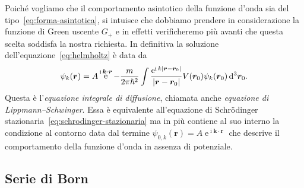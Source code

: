 \documentclass[a4paper,fleqn,twoside,12pt]{article}
\newcommand*{\dd}{\mathop{}\!\mathrm{d}} %
\DeclareMathOperator{\e}{\mathrm{e}} %
\DeclareMathOperator{\uimm}{\mathrm{i}} %
\DeclarePairedDelimiter{\abs}{\lvert}{\rvert}
\begin{document}
Poiché vogliamo che il comportamento asintotico della funzione d'onda sia del
tipo~\eqref{eq:forma-asintotica}, si intuisce che dobbiamo prendere in
considerazione la funzione di Green uscente $G_{+}$ e in effetti verificheremo
più avanti che questa scelta soddisfa la nostra richiesta.  In definitiva la
soluzione dell'equazione~\eqref{eq:helmholtz} è data da
\begin{equation}
  \label{eq:lippmann-schwinger}
  \psi_{k}(\bm{r}) = A\e^{\uimm \bm{k}\cdot\bm{r}} - \frac{m}{2\pi\hslash^{2}}
  \int \frac{\e^{\uimm k\abs{\bm{r} - \bm{r}_{0}}}}{\abs{\bm{r} - \bm{r}_{0}}}
  V(\bm{r}_{0}) \psi_{k}(\bm{r}_{0}) \dd^{3}\bm{r}_{0}.
\end{equation}
Questa è l'\emph{equazione integrale di diffusione}, chiamata anche
\emph{equazione di Lippmann–Schwinger}.  Essa è equivalente all'equazione di
Schrödinger stazionaria~\eqref{eq:schrodinger-stazionaria} ma in più contiene al
suo interno la condizione al contorno data dal termine
$\psi_{0,k}(\bm{r}) = A\e^{\uimm \bm{k}\cdot\bm{r}}$ che descrive il
comportamento della funzione d'onda in assenza di potenziale.

\subsection{Serie di Born}
\label{sec:serie-born}
\end{document}
